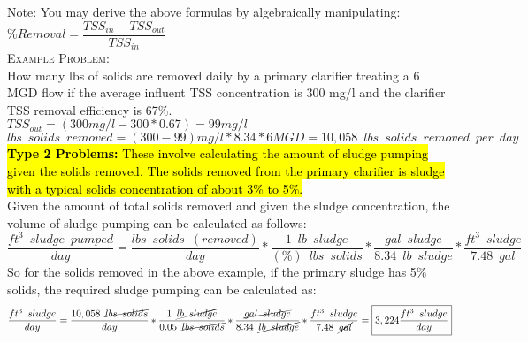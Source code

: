 Note:  You may derive the above formulas by algebraically manipulating: $\%Removal=\dfrac{TSS_{in} -TSS_{out}}{TSS_{in}}$\\
\noindent\textsc{Example Problem:}\\
How many lbs of solids are removed daily by a primary clarifier treating a 6 MGD flow if the average influent TSS concentration is 300 mg/l and the clarifier TSS removal efficiency is 67\%.\\
$TSS_{out}=(300mg/l - 300*0.67)=99mg/l$\\
$lbs \enspace solids \enspace  removed = (300-99)mg/l*8.34*6MGD=\boxed{10,058 \enspace lbs \enspace solids \enspace removed \enspace per \enspace day}$\\
\vspace{0.5cm}
\hl{\textbf{Type 2 Problems:}  These involve calculating the amount of sludge pumping given the solids removed.  The solids removed from the primary clarifier is sludge with a typical solids concentration of about 3\% to 5\%.}\\
Given the amount of total solids removed and given the sludge concentration, the volume of sludge pumping can be calculated as follows:  $$\dfrac{ft^3\enspace sludge\enspace pumped}{ day}= \dfrac{lbs \enspace solids \enspace (removed)}{day} * \dfrac{1 \enspace lb \enspace sludge}{(\%)\enspace lbs \enspace solids}*\dfrac{gal \enspace sludge}{8.34\enspace lb \enspace sludge}*\dfrac{ft^3 \enspace sludge}{7.48 \enspace gal} $$
So for the solids removed in the above example, if the primary sludge has 5\% solids, the required sludge pumping can be calculated as:
$$\dfrac{ft^3\enspace sludge}{day}= \dfrac{10,058 \enspace \cancel{lbs \enspace solids}}{day} * \dfrac{1 \enspace \cancel{lb \enspace sludge}}{0.05\enspace \cancel{lbs \enspace solids}}*\dfrac{\cancel{gal \enspace sludge}}{8.34 \enspace \cancel{lb \enspace sludge}}*\dfrac{ft^3 \enspace sludge}{7.48 \enspace \cancel{gal}}=\boxed{3,224\dfrac{ft^3 \enspace sludge}{day}} $$
